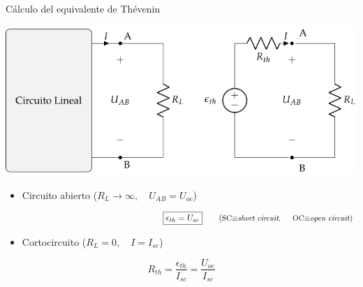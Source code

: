 \documentclass[aspectratio=169, xcolor={usenames,svgnames,dvipsnames}]{beamer}
\begin{document}

\begin{frame}{Cálculo del equivalente de Thévenin}
    \vspace{2mm}
    \begin{center}
    \includegraphics[height=0.43\textheight]{../figs/EquivalenteThevenin_R.pdf}
    \end{center}
    
    \begin{itemize}
    \item Circuito abierto (\(R_L \to \infty, \quad U_{AB} = U_{oc}\))
    \end{itemize}

    \vspace{-5mm}
    \[
    \hspace{65mm}
    \boxed{\epsilon_{th} = U_{oc}} 
    \qquad \textrm{(\small{SC$\equiv$\textit{short circuit}, \hspace*{4mm}OC$\equiv$\textit{open circuit}})}
    \] 
    
    \vspace{-1mm}
    \begin{itemize}
    \item Cortocircuito (\(R_L = 0, \quad I = I_{sc}\))
    \end{itemize}
    \[
    \boxed{R_{th} = \frac{\epsilon_{th}}{I_{sc}} = \frac{U_{oc}}{I_{sc}}}
    \]
\end{frame}

\end{document}
